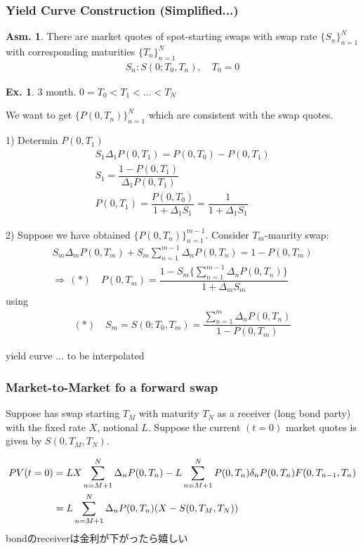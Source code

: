 \documentclass[a4paper,11pt]{jsarticle}
\theoremstyle{definition}
\newtheorem{ex}{Ex.}[subsection]
\newtheorem{asm}{Asm.}[subsection]
\newcommand{\df}[2]{\dfrac{#1}{#2}}
\begin{document}
\subsubsection{Yield Curve Construction (Simplified...)}
\begin{asm}
  There are market quotes of spot-starting swaps with swap rate
  $\{S_n\}_{n=1}^N$ with corresponding maturities $\{T_n\}_{n=1}^N$
  \begin{align}
    S_n:S(0;T_0,T_n), \quad T_0=0
  \end{align}
\end{asm}


\begin{ex}
  3 month. $0=T_0<T_1<...<T_N$
\end{ex}
We want to get $\{P(0,T_n)\}_{n=1}^N$ which are consistent with
the swap quotes.

1) Determin $P(0,T_1)$
\begin{align}
  S_1 \Delta_1 P(0,T_1)=P(0,T_0)-P(0,T_1) \\
  S_1 = \df{1-P(0,T_1)}{\Delta_1 P(0,T_1)} \\
  P(0,T_1)=\df{P(0,T_0)}{1+\Delta_1 S_1}=\df{1}{1+\Delta_1 S_1}
\end{align}

2) Suppose we have obtained $\{P(0,T_n)\}_{n=1}^{m-1}$.
Consider $T_m$-maurity swap:
\begin{align}
  S_m \Delta_m P(0,T_m)+S_m \sum_{n=1}^{m-1} \Delta_n P(0,T_n)
  =1-P(0,T_m) \\
  \Rightarrow \, (*) \quad
  P(0,T_m)=\df{1-S_m\{\sum_{n=1}^{m-1}\Delta_n P(0,T_n)\}}
  {1+\Delta_m S_m}
\end{align}
using
\begin{align}
  (*) \quad S_m=S(0;T_0,T_m)
  =\df{\sum_{n=1}^{m}\Delta_n P(0,T_n)}{1-P(0,T_m)}
\end{align}

yield curve ... to be interpolated


\subsubsection{Market-to-Market fo a forward swap}
Suppose has swap starting $T_M$ with maturity $T_N$
as a receiver (long bond party) with the fixed rate $X$,
notional $L$.
Suppose the current $(t=0)$ market quotes is given by
$S(0,T_M,T_N)$.

\begin{align}
  PV(t=0) &= LX\sum_{n=M+1}^N \Delta_n P(0,T_n)
  -L\sum_{n=M+1}^{N}P(0,T_n)\delta_n P(0,T_n)F(0,T_{n-1},T_n)
  \notag\\
  &=L\sum_{n=M+1}^{N}\Delta_n P(0,T_n)(X-S(0,T_M,T_N))
\end{align}
bondのreceiverは金利が下がったら嬉しい
\end{document}
